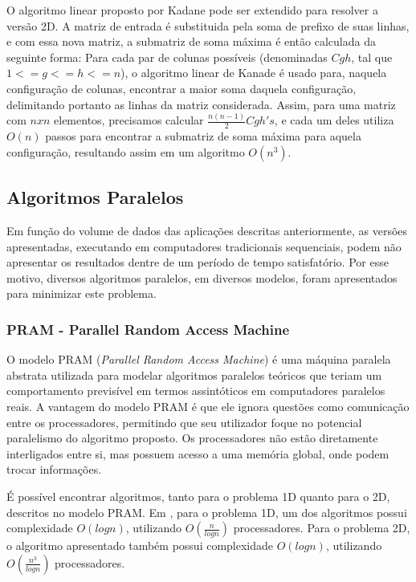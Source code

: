 \documentclass[a4paper, 12pt] {article}
\begin{document}
O algoritmo linear proposto por Kadane pode ser extendido para resolver a versão
2D. A matriz de entrada é substituida pela soma de prefixo de suas linhas, e com
essa nova matriz, a submatriz de soma máxima é então calculada da seguinte
forma: Para cada par de colunas possíveis (denominadas $Cgh$, tal que $1 <= g
<= h <= n$), o algoritmo linear de Kanade é usado para, naquela configuração de
colunas, encontrar a maior soma daquela configuração, delimitando portanto as linhas da matriz considerada. Assim, para
uma matriz com $nxn$ elementos, precisamos calcular $\frac{n(n-1)}{2} Cgh's$, e
cada um deles utiliza $O(n)$ passos para encontrar a submatriz de soma máxima
para aquela configuração, resultando assim em um algoritmo $O(n^3)$.

\subsection{Algoritmos Paralelos}

Em função do volume de dados das aplicações descritas anteriormente, as
versões apresentadas, executando em computadores tradicionais sequenciais, podem
não apresentar os resultados dentre de um período de tempo satisfatório. Por
esse motivo, diversos algoritmos paralelos, em diversos modelos, foram
apresentados para minimizar este problema.

\subsubsection{PRAM - Parallel Random Access Machine}

O modelo PRAM (\textit{Parallel Random Access Machine}) é uma máquina paralela
abstrata utilizada para modelar algoritmos paralelos teóricos que teriam um
comportamento previsível em termos assintóticos em computadores paralelos reais.
A vantagem do modelo PRAM é que ele ignora questões como comunicação entre os
processadores, permitindo que seu utilizador foque no potencial paralelismo do
algoritmo proposto. Os processadores não estão diretamente interligados entre
si, mas possuem acesso a uma memória global, onde podem trocar informações.

É possível encontrar algoritmos, tanto para o problema 1D quanto para o 2D,
descritos no modelo PRAM. Em \cite{journals/ppl/PerumallaD95}, para o problema
1D, um dos algoritmos  possui complexidade $O(log n)$, utilizando $O(\frac{n}{log
n})$ processadores. Para o problema 2D, o algoritmo apresentado também possui
complexidade $O(log n)$, utilizando $O(\frac{n^3}{log
n})$ processadores.
\end{document}

